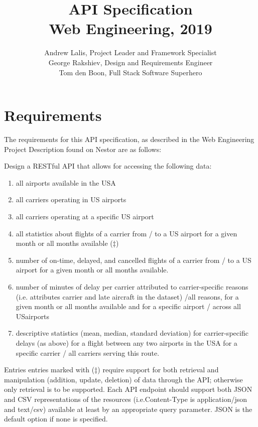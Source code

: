 \documentclass[a4paper, 12pt]{article}
\title{API Specification \\ \small{Web Engineering, 2019}}
\author{Andrew Lalis, Project Leader and Framework Specialist \\ 
George Rakshiev, Design and Requirements Engineer \\ 
Tom den Boon, Full Stack Software Superhero}
\begin{document}
\maketitle

\section{Requirements}
	The requirements for this API specification, as described in the Web Engineering Project Description found on Nestor are as follows:
	
	\noindent Design a RESTful API that allows for accessing the following data:
	
	\begin{enumerate}
		\item all airports available in the USA
		\item all carriers operating in US airports
		\item all carriers operating at a specific US airport
		\item all statistics about flights of a carrier from / to a US airport for a given month or all months available (‡)
		\item number of on-time, delayed, and cancelled flights of a carrier from / to a US airport for a given month or all months available.
		\item  number of minutes of delay per carrier attributed to carrier-specific reasons (i.e.  attributes carrier and late aircraft in  the  dataset) /all  reasons,  for  a given month or all months available and for a specific airport / across all USairports
		\item descriptive statistics (mean, median, standard deviation) for carrier-specific delays (as above) for a flight between any two airports in the USA for a specific carrier / all carriers serving this route.
	\end{enumerate}
	
	Entries entries marked with (‡) require support for both retrieval and manipulation  (addition,  update,  deletion)  of  data  through  the  API;  otherwise  only retrieval  is  to  be  supported.   Each  API  endpoint  should  support  both  JSON and CSV representations of the resources (i.e.Content-Type is application/json and text/csv) available at least by an appropriate query parameter.  JSON is the default option if none is specified.
\end{document}
